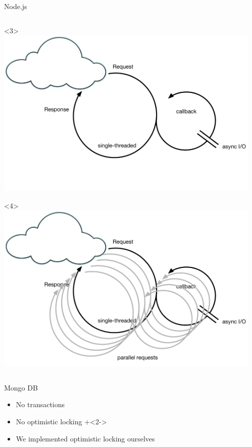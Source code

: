 \begin{frame}[fragile]{Node.js}
\begin{columns}[T]
\begin{column}{.7\textwidth}
\begin{onlyenv}<3>
\includegraphics[width=\WIDTH]{../Nodejs3.pdf}
\end{onlyenv}

\begin{onlyenv}<4>
\includegraphics[width=\WIDTH]{../Nodejs4.pdf}
\end{onlyenv}
\end{column}
\hfill 
\begin{column}{.2\textwidth}
\begin{tiny}
\end{tiny}
\end{column}
\end{columns}

\end{frame}

\begin{frame}[fragile]{Mongo DB}

\begin{itemize}
\item No transactions
\item No optimistic locking
\onslide+<2->
\item We implemented optimistic locking ourselves
\end{itemize}

\end{frame}

